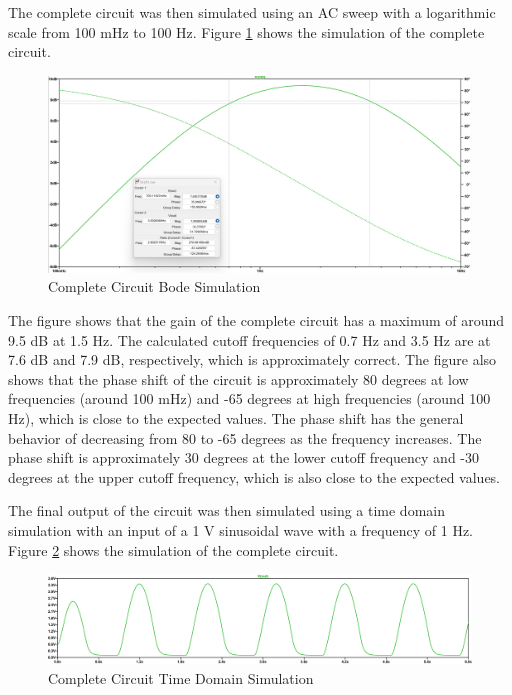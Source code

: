 \documentclass[CMPE]{KGCOEReport}
\begin{document}
\bigskip

The complete circuit was then simulated using an AC sweep with a logarithmic scale from 100 mHz to 100 Hz. Figure \ref{fig:completeSim} shows the simulation of the complete circuit.

\begin{figure}[H]
    \centering
    \includegraphics[width=1\textwidth]{SimFreqOutputValues.png}
    \caption{Complete Circuit Bode Simulation}
    \label{fig:completeSim}
\end{figure}

The figure shows that the gain of the complete circuit has a maximum of around 9.5 dB at 1.5 Hz. The calculated cutoff frequencies of 0.7 Hz and 3.5 Hz are at 7.6 dB and 7.9 dB, respectively, which is approximately correct. The figure also shows that the phase shift of the circuit is approximately 80 degrees at low frequencies (around 100 mHz) and -65 degrees at high frequencies (around 100 Hz), which is close to the expected values. The phase shift has the general behavior of decreasing from 80 to -65 degrees as the frequency increases. The phase shift is approximately 30 degrees at the lower cutoff frequency and -30 degrees at the upper cutoff frequency, which is also close to the expected values.

The final output of the circuit was then simulated using a time domain simulation with an input of a 1 V sinusoidal wave with a frequency of 1 Hz. Figure \ref{fig:timeSim} shows the simulation of the complete circuit.

\begin{figure}[H]
    \centering
    \includegraphics[width=1\textwidth]{SimTimeOutput.png}
    \caption{Complete Circuit Time Domain Simulation}
    \label{fig:timeSim}
\end{figure}
\end{document}
